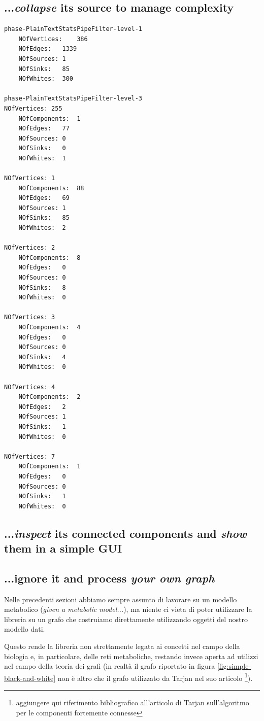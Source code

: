 \subsection{...\emph{collapse} its source to manage complexity}
\begin{lstlisting}
phase-PlainTextStatsPipeFilter-level-1
	NOfVertices:	386
	NOfEdges:	1339
	NOfSources:	1
	NOfSinks:	85
	NOfWhites:	300

phase-PlainTextStatsPipeFilter-level-3
NOfVertices: 255
	NOfComponents:	1
	NOfEdges:	77
	NOfSources:	0
	NOfSinks:	0
	NOfWhites:	1

NOfVertices: 1
	NOfComponents:	88
	NOfEdges:	69
	NOfSources:	1
	NOfSinks:	85
	NOfWhites:	2

NOfVertices: 2
	NOfComponents:	8
	NOfEdges:	0
	NOfSources:	0
	NOfSinks:	8
	NOfWhites:	0

NOfVertices: 3
	NOfComponents:	4
	NOfEdges:	0
	NOfSources:	0
	NOfSinks:	4
	NOfWhites:	0

NOfVertices: 4
	NOfComponents:	2
	NOfEdges:	2
	NOfSources:	1
	NOfSinks:	1
	NOfWhites:	0

NOfVertices: 7
	NOfComponents:	1
	NOfEdges:	0
	NOfSources:	0
	NOfSinks:	1
	NOfWhites:	0

\end{lstlisting}

\subsection{...\emph{inspect} its connected components and \emph{show}
  them in a simple GUI}

\subsection{...ignore it and process \emph{your own graph}}
Nelle precedenti sezioni abbiamo sempre assunto di lavorare su un
modello metabolico (\emph{given a metabolic model...}), ma niente ci
vieta di poter utilizzare la libreria su un grafo che costruiamo
direttamente utilizzando oggetti del nostro modello dati.

Questo rende la libreria non strettamente legata ai concetti nel campo
della biologia e, in particolare, delle reti metaboliche, restando
invece aperta ad utilizzi nel campo della teoria dei grafi (in
realt\`a il grafo riportato in figura \ref{fig:simple-black-and-white}
non \`e altro che il grafo utilizzato da Tarjan nel suo articolo
\footnote{aggiungere qui riferimento bibliografico all'articolo di
  Tarjan sull'algoritmo per le componenti fortemente connesse}).


